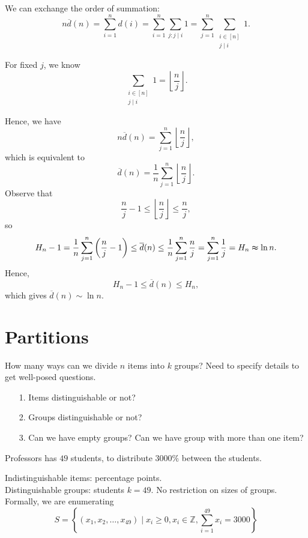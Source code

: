 We can exchange the order of summation: 
\[
    n \overline{d}(n) = \sum_{i=1}^n d(i) = \sum_{i=1}^n \sum_{j: j \mid i} 1 = \sum_{j=1}^n \sum_{\substack{i \in [n] \\ j \mid i}} 1.
\]

For fixed \(j\), we know 
\[
    \sum_{\substack{i \in [n] \\ j \mid i}} 1 = \left\lfloor \frac{n}{j} \right\rfloor.
\] 

Hence, we have 
\[
    n \overline{d}(n) = \sum_{j=1}^n \left\lfloor \frac{n}{j} \right\rfloor,
\] which is equivalent to 
\[
    \overline{d}(n) = \frac{1}{n}\sum_{j=1}^n \left\lfloor \frac{n}{j} \right\rfloor.
\]
Observe that 
\[
    \frac{n}{j} - 1 \le \left\lfloor \frac{n}{j} \right\rfloor \le \frac{n}{j},
\] so 
\[
     H_n - 1=\frac{1}{n} \sum_{j=1}^n \left( \frac{n}{j} - 1 \right) \le \overline{d}(n) \le \frac{1}{n} \sum_{j=1}^n \frac{n}{j} = \sum_{j=1}^n \frac{1}{j} = H_n \thickapprox \ln n.    
\]
Hence, 
\[
    H_n - 1 \le \overline{d}(n) \le H_n, 
\]which gives \(\overline{d}(n) \sim \ln n\). 

\chapter{Partitions}
How many ways can we divide \(n\) items into \(k\) groups? Need to specify details to get well-posed questions. 
\begin{itemize}
    \item [1.] Items distinguishable or not?
    \item [2.] Groups distinguishable or not?
    \item [3.] Can we have empty groups? Can we have group with more than one item?
\end{itemize}  

\begin{eg}
    Professors has \(49\) students, to distribute \(3000\%\) between the students. 
\end{eg}
\begin{explanation}
    Indistinguishable items: percentage points. \\
    Distinguishable groups: students \(k=49\). No restriction on sizes of groups. Formally, we are enumerating 
    \[
        S = \left\{ (x_1, x_2, \dots , x_{49}) \mid x_i \ge 0, x_i \in \mathbb{Z} , \sum_{i=1}^{49} x_i = 3000  \right\} 
    \]
\end{explanation}